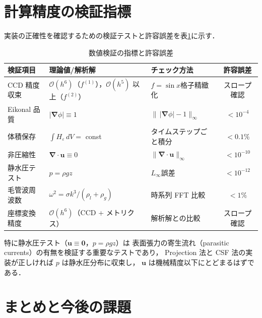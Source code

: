\documentclass[12pt, a4paper, titlepage]{article}
\newcommand{\jp}[1]{{\normalfont\jpfont #1}}
\newcommand{\bu}{\bm{u}}
\newcommand{\bnabla}{\bm{\nabla}}
\newcommand{\He}{H_\varepsilon}
\newcommand{\Ord}[1]{\mathcal{O}(#1)}
\newcommand{\fp}[1]{f^{(1)}_{#1}}
\newcommand{\fpp}[1]{f^{(2)}_{#1}}
\begin{document}
\section{\jp{計算精度の検証指標}}
\label{sec:verification}

\jp{実装の正確性を確認するための検証テストと許容誤差を表\ref{tab:verification}に示す．}

\begin{table}[h]
\centering
\caption{\jp{数値検証の指標と許容誤差}}
\label{tab:verification}
\begin{tabular}{p{35mm}p{40mm}p{35mm}c}
\toprule
\jp{検証項目} & \jp{理論値/解析解} & \jp{チェック方法} & \jp{許容誤差}\\
\midrule
\jp{CCD 精度収束} & $\Ord{h^6}$\jp{（$\fp{}$），$\Ord{h^5}$ 以上（$\fpp{}$）} & $f=\sin x$\jp{格子精緻化} & \jp{スロープ確認}\\[3pt]
\jp{Eikonal 品質} & $|\bnabla\phi| \equiv 1$ & $\|\,|\bnabla\phi|-1\|_\infty$ & $< 10^{-4}$\\[3pt]
\jp{体積保存} & $\int\He\,dV = $ const & \jp{タイムステップごと積分} & $< 0.1\%$\\[3pt]
\jp{非圧縮性} & $\bnabla\cdot\bu \equiv 0$ & $\|\bnabla\cdot\bu\|_\infty$ & $< 10^{-10}$\\[3pt]
\jp{静水圧テスト} & $p = \rho g z$ & $L_\infty$\jp{誤差} & $< 10^{-12}$\\[3pt]
\jp{毛管波周波数} & $\omega^2 = \sigma k^3/(\rho_l+\rho_g)$ & \jp{時系列 FFT 比較} & $< 1\%$\\[3pt]
\jp{座標変換精度} & $\Ord{h^6}$\jp{（CCD + メトリクス）} & \jp{解析解との比較} & \jp{スロープ確認}\\
\bottomrule
\end{tabular}
\end{table}

\jp{特に静水圧テスト（$\bu\equiv\bm{0}$，$p=\rho g z$）は
表面張力の寄生流れ（parasitic currents）の有無を検証する重要なテストであり，
Projection 法と CSF 法の実装が正しければ $p$ は静水圧分布に収束し，
$\bu$ は機械精度以下にとどまるはずである．}


\section{\jp{まとめと今後の課題}}
\label{sec:conclusion}
\end{document}
